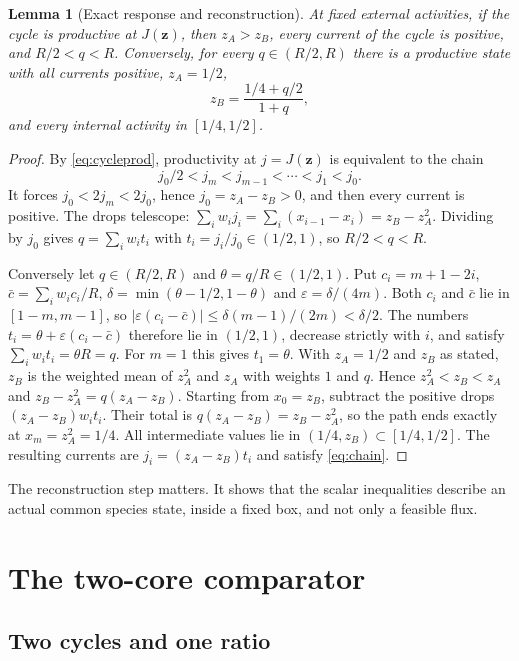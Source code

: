 \documentclass[11pt,a4paper]{article}
\theoremstyle{plain}
\newtheorem{lemma}[theorem]{Lemma}
\theoremstyle{definition}
\theoremstyle{remark}
\newcommand{\act}{\boldsymbol z}
\begin{document}
\begin{lemma}[Exact response and reconstruction]\label{lem:response}
At fixed external activities, if the cycle is productive at $J(\act)$, then $z_A>z_B$, every current of the cycle is positive, and $R/2<q<R$. Conversely, for every $q\in(R/2,R)$ there is a productive state with all currents positive, $z_A=1/2$,
\[
 z_B=\frac{1/4+q/2}{1+q},
\]
and every internal activity in $[1/4,1/2]$.
\end{lemma}

\begin{proof}
By \eqref{eq:cycleprod}, productivity at $j=J(\act)$ is equivalent to the chain
\begin{equation}\label{eq:chain}
 j_0/2<j_m<j_{m-1}<\cdots<j_1<j_0 .
\end{equation}
It forces $j_0<2j_m<2j_0$, hence $j_0=z_A-z_B>0$, and then every current is positive. The drops telescope: $\sum_iw_ij_i=\sum_i(x_{i-1}-x_i)=z_B-z_A^2$. Dividing by $j_0$ gives $q=\sum_iw_it_i$ with $t_i=j_i/j_0\in(1/2,1)$, so $R/2<q<R$.

Conversely let $q\in(R/2,R)$ and $\theta=q/R\in(1/2,1)$. Put $c_i=m+1-2i$, $\bar c=\sum_iw_ic_i/R$, $\delta=\min(\theta-1/2,1-\theta)$ and $\varepsilon=\delta/(4m)$. Both $c_i$ and $\bar c$ lie in $[1-m,m-1]$, so $|\varepsilon(c_i-\bar c)|\le\delta(m-1)/(2m)<\delta/2$. The numbers $t_i=\theta+\varepsilon(c_i-\bar c)$ therefore lie in $(1/2,1)$, decrease strictly with $i$, and satisfy $\sum_iw_it_i=\theta R=q$. For $m=1$ this gives $t_1=\theta$. With $z_A=1/2$ and $z_B$ as stated, $z_B$ is the weighted mean of $z_A^2$ and $z_A$ with weights $1$ and $q$. Hence $z_A^2<z_B<z_A$ and $z_B-z_A^2=q(z_A-z_B)$. Starting from $x_0=z_B$, subtract the positive drops $(z_A-z_B)w_it_i$. Their total is $q(z_A-z_B)=z_B-z_A^2$, so the path ends exactly at $x_m=z_A^2=1/4$. All intermediate values lie in $(1/4,z_B)\subset[1/4,1/2]$. The resulting currents are $j_i=(z_A-z_B)t_i$ and satisfy \eqref{eq:chain}.
\end{proof}

The reconstruction step matters. It shows that the scalar inequalities describe an actual common species state, inside a fixed box, and not only a feasible flux.

\section{The two-core comparator}\label{sec:comparator}

\subsection{Two cycles and one ratio}
\end{document}
